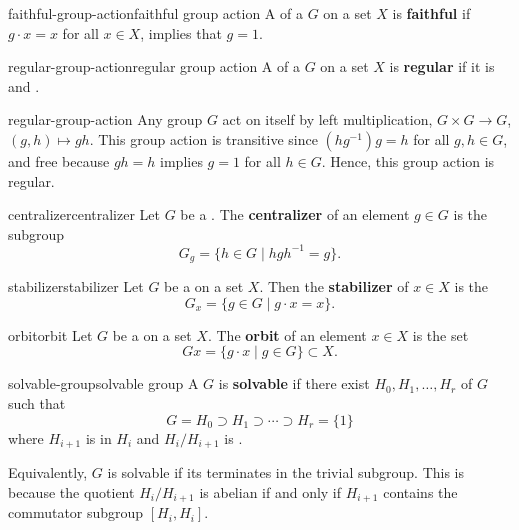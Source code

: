 \begin{topic}{faithful-group-action}{faithful group action}
    A  of a  $G$ on a set $X$ is \textbf{faithful} if $g \cdot x = x$ for all $x \in X$, implies that $g = 1$.
\end{topic}

\begin{topic}{regular-group-action}{regular group action}
    A  of a  $G$ on a set $X$ is \textbf{regular} if it is  and .
\end{topic}

\begin{example}{regular-group-action}
    Any group $G$ act on itself by left multiplication, $G \times G \to G$, $(g, h) \mapsto gh$. This group action is transitive since $(hg^{-1}) g = h$ for all $g, h \in G$, and free because $gh = h$ implies $g = 1$ for all $h \in G$. Hence, this group action is regular.
\end{example}

\begin{topic}{centralizer}{centralizer}
    Let $G$ be a . The \textbf{centralizer} of an element $g \in G$ is the subgroup
    \[ G_g = \{ h \in G \mid h g h^{-1} = g \} . \]
\end{topic}

\begin{topic}{stabilizer}{stabilizer}
    Let $G$ be a   on a set $X$. Then the \textbf{stabilizer} of $x \in X$ is the 
    \[ G_x = \{ g \in G \mid g \cdot x = x \} . \]
\end{topic}

\begin{topic}{orbit}{orbit}
    Let $G$ be a   on a set $X$. The \textbf{orbit} of an element $x \in X$ is the set
    \[ G x = \{ g \cdot x \mid g \in G \} \subset X . \]
\end{topic}

\begin{topic}{solvable-group}{solvable group}
    A  $G$ is \textbf{solvable} if there exist  $H_0, H_1, \ldots, H_r$ of $G$ such that
    \[ G = H_0 \supset H_1 \supset \cdots \supset H_r = \{ 1 \} \]
    where $H_{i + 1}$ is  in $H_i$ and $H_i/H_{i + 1}$ is .
    
    Equivalently, $G$ is solvable if its  terminates in the trivial subgroup. This is because the quotient $H_i/H_{i + 1}$ is abelian if and only if $H_{i + 1}$ contains the commutator subgroup $[H_i, H_i]$.
\end{topic}

